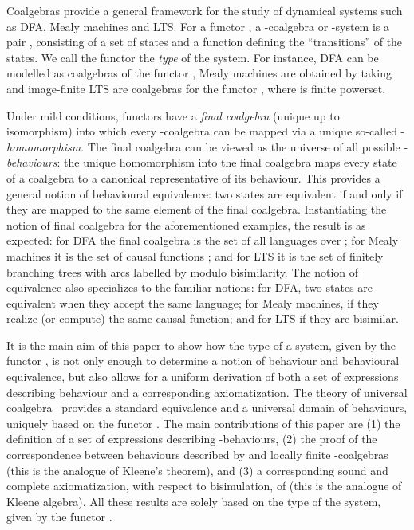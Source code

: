 \documentclass{LMCS}
\def\hyph{-\penalty0\hskip0pt\relax}
\theoremstyle{definition}
\theoremstyle{plain}
\theoremstyle{plain}
\theoremstyle{plain}
\theoremstyle{plain}
\theoremstyle{definition}
\theoremstyle{definition}
\begin{document}
Coalgebras provide a general framework for the study of dynamical
systems such as DFA, Mealy machines and LTS. For a functor
, a -coalgebra or -system is a pair ,
consisting of a set  of states and a function 
defining the ``transitions'' of the states. We call the functor 
the \emph{type} of the system. For instance, DFA can be modelled as
coalgebras of the functor , Mealy machines are obtained by taking  and 
image-finite LTS are coalgebras for the functor , where  is finite powerset.


Under mild conditions, functors  have a \emph{final coalgebra}
(unique up to isomorphism) into which every -coalgebra can be
mapped via a unique so-called \hyph\emph{homomorphism}. The final
coalgebra can be viewed as the universe of all possible
-\emph{behaviours}: the unique homomorphism into the final
coalgebra maps every state of a coalgebra to a canonical
representative of its behaviour. This provides a general notion of
behavioural equivalence: two states are equivalent if and only if they are
mapped to the same element of the final coalgebra. Instantiating the
notion of final coalgebra for the aforementioned examples, the result
is as expected: for DFA the final coalgebra is the set  of all languages over ; for Mealy
machines it is the set of causal functions ;
and for LTS it is the set of
finitely branching trees with arcs labelled by  modulo bisimilarity. The notion of
equivalence also specializes to the familiar notions: for DFA, two states are
equivalent when they accept the same language;
for Mealy machines, if they realize (or compute) the same causal function; and 
for LTS if they are bisimilar.

It is the main aim of this paper to show how the type of a system,
given by the functor , is not only enough to determine a notion of
behaviour and behavioural equivalence, but also allows for a uniform
derivation of both 
a set of expressions describing behaviour and a corresponding
axiomatization. The theory of universal coalgebra~\cite{Rutten00}
provides a standard equivalence and a universal domain of behaviours,
uniquely based on the functor . The main contributions of this
paper are (1) the definition of a set of expressions 
describing -behaviours, (2) the proof of the correspondence between
behaviours described by  and locally finite -coalgebras (this is the analogue of Kleene's theorem),  and (3) a corresponding sound and complete
axiomatization, with respect to bisimulation, of  (this is the analogue of
Kleene algebra). All these results are solely based on the type of
the system, given by the functor . 
\end{document}
